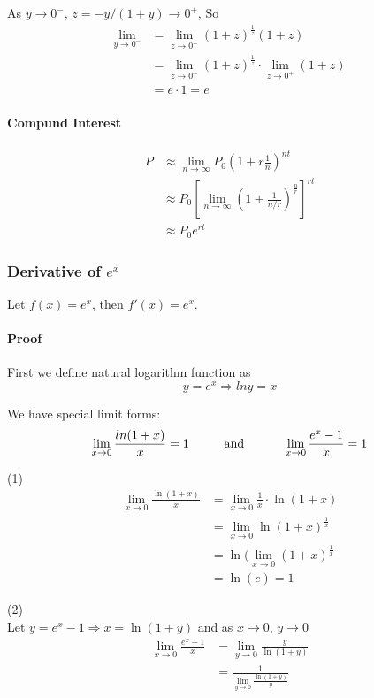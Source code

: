 \documentclass[12pt]{article}
\newcommand\tab[1][1cm]{\hspace*{#1}}
\begin{document}
\noindent
As $y \to 0^{-}$, $z = -y/(1 + y) \to 0^{+}$, So
\begin{align*} 
    \lim_{y \to 0^{-}} &= \lim_{z \to 0^{+}} (1 + z)^{\frac{1}{z}}(1 + z) \\
    &= \lim_{z \to 0^{+}} (1 + z)^{\frac{1}{z}} \cdot \lim_{z \to 0^{+}} (1 + z) \\
    &= e \cdot 1 = e
\end{align*}

\paragraph{Compund Interest} 
\begin{align*} 
    P &\approx \lim_{n \to \infty} P_0 \left( 1 + r \frac{1}{n}\right)^{nt} \\
    &\approx P_0 \left[\lim_{n \to \infty} \left( 1 + \frac{1}{n/r}\right)^{\frac{n}{r}} \right]^{rt} \\
    &\approx P_0 e^{rt}
\end{align*}

\subsubsection{Derivative of $e^x$}
Let $f(x) = e^x$, then $f'(x) = e^x$.
\paragraph{Proof} First we define natural logarithm function as 
\[
    y = e^x \Rightarrow ln y = x    
\]

\noindent 
We have special limit forms:
\[
    \lim_{x \to 0} \frac{ln(1 + x)}{x} = 1 \textrm{\tab and \tab} \lim_{x \to 0} \frac{e^x - 1}{x} = 1 
\]

(1)
\begin{align*} 
    \lim_{x \to 0} \frac{\ln(1 + x)}{x} &= \lim_{x \to 0} \frac{1}{x} \cdot {\ln(1 + x)} \\
    &= \lim_{x \to 0} \ln(1 + x)^{\frac{1}{x}} \\
    &= \ln(\lim_{x \to 0} (1 + x)^\frac{1}{x} \\
    &= \ln(e) = 1
\end{align*}

(2)
\\


Let $y = e^x - 1 \Rightarrow  x = \ln(1 + y)$ and as $x \to 0$, $y \to 0$
\begin{align*} 
    \lim_{x \to 0} \frac{e^x - 1}{x} &= \lim_{y \to 0} \frac{y}{\ln(1 + y)} \\
    &= \frac{1}{\lim_{y \to 0} \frac{\ln(1 + y)}{y}}
\end{align*}
\end{document}
